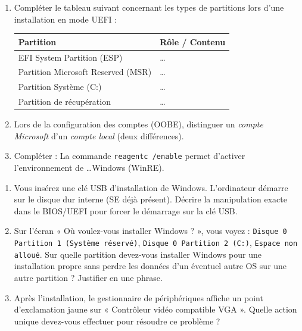 \documentclass[11pt]{article}
\begin{document}
\begin{exercice}
\begin{enumerate}
    \item Compléter le tableau suivant concernant les types de partitions lors d'une installation en mode UEFI :
    \begin{tabular}{|l|l|}
    \hline
    \textbf{Partition} & \textbf{Rôle / Contenu} \\ \hline
    EFI System Partition (ESP) & \ldots \\ \hline
    Partition Microsoft Reserved (MSR) & \ldots \\ \hline
    Partition Système (C:) & \ldots \\ \hline
    Partition de récupération & \ldots \\ \hline
    \end{tabular}
    \item Lors de la configuration des comptes (OOBE), distinguer un \textit{compte Microsoft} d'un \textit{compte local} (deux différences).
    \item Compléter : La commande \texttt{reagentc /enable} permet d'activer l'environnement de \ldots Windows (WinRE).
\end{enumerate}
\end{exercice}

\begin{exercice}
\begin{enumerate}
    \item Vous insérez une clé USB d'installation de Windows. L'ordinateur démarre sur le disque dur interne (SE déjà présent). Décrire la manipulation exacte dans le BIOS/UEFI pour forcer le démarrage sur la clé USB.
    \item Sur l'écran « Où voulez-vous installer Windows ? », vous voyez : \texttt{Disque 0 Partition 1 (Système réservé)}, \texttt{Disque 0 Partition 2 (C:)}, \texttt{Espace non alloué}. Sur quelle partition devez-vous installer Windows pour une installation propre sans perdre les données d'un éventuel autre OS sur une autre partition ? Justifier en une phrase.
    \item Après l'installation, le gestionnaire de périphériques affiche un point d'exclamation jaune sur « Contrôleur vidéo compatible VGA ». Quelle action unique devez-vous effectuer pour résoudre ce problème ?
\end{enumerate}
\end{exercice}
\end{document}
